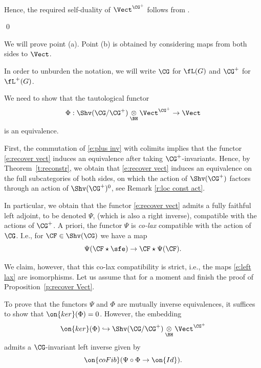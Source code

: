 \documentclass[9pt]{amsart}
\theoremstyle{definition}
\theoremstyle{remark}
\newcommand{\thmref}[1]{Theorem~\ref{#1}}
\newcommand{\propref}[1]{Proposition~\ref{#1}}
\numberwithin{equation}{section}
\begin{document}
\sssec{}

Hence, the required self-duality of $\Vect^{\CG^+}$ follows from \cite[Chapter 1, Proposition 9.5.3]{GR1}.

\qed

\ssec{Proof of \propref{p:recover Vect}} \label{ss:recover Vect}

We will prove point (a). Point (b) is obtained by considering maps from both sides to $\Vect$. 

\medskip

In order to unburden the notation, we will write $\CG$ for $\fL(G)$ and $\CG^+$ for $\fL^+(G)$. 

\sssec{}

We need to show that the tautological functor
\begin{equation} \label{e:recover vect}
\Phi:\Shv(\CG/\CG^+)\underset{\BH}\otimes \Vect^{\CG^+}\to \Vect
\end{equation}
is an equivalence.

\medskip

First, the commutation of \eqref{e:plus inv} with colimits implies that the functor \eqref{e:recover vect}
induces an equivalence after taking $\CG^+$-invariants. Hence, by \thmref{t:reconstr}, we obtain 
that \eqref{e:recover vect} induces an equivalence on the full subcategories of both sides, on
which the action of $\Shv(\CG^+)$ factors through an action of $\Shv(\CG^+)^0$,
see Remark \ref{r:loc const act}. 

\medskip

In particular, we obtain that the functor \eqref{e:recover vect} admits a fully faithful left adjoint, to be denoted $\Psi$,  
(which is also a right inverse), compatible with the actions of $\CG^+$. A priori, the functor $\Psi$ is \emph{co-lax}
compatible with the action of $\CG$. I.e., for $\CF\in \Shv(\CG)$ we have a map
\begin{equation} \label{e:left lax}
\Psi(\CF\star \sfe)\to \CF\star \Psi(\CF).
\end{equation}

We claim, however, that this co-lax compatibility is strict, i.e., the maps \eqref{e:left lax} are isomorphisms. Let us assume 
that for a moment and finish the proof of \propref{p:recover Vect}. 

\sssec{}

To prove that the functors $\Psi$ and $\Phi$ are mutually inverse equivalences, it suffices to show that $\on{ker}(\Phi)=0$.
However, the embedding
$$\on{ker}(\Phi)\hookrightarrow \Shv(\CG/\CG^+)\underset{\BH}\otimes \Vect^{\CG^+}$$
admits a $\CG$-invariant left inverse given by
$$\on{coFib}(\Psi\circ \Phi\to \on{Id}).$$
\end{document}
